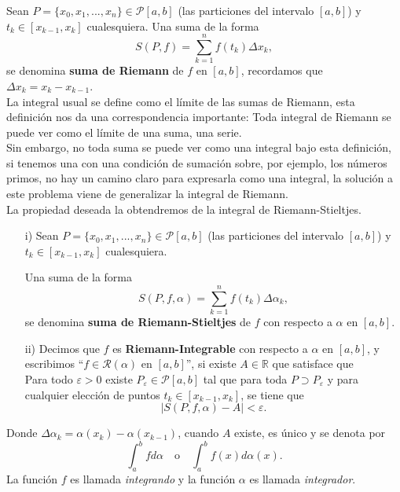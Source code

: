 Sean $P=\{x_0,x_1,...,x_n\}\in\mathcal{P}[a,b]$ (las particiones del intervalo $[a,b]$) y   $t_{k}\in [x_{k-1},x_k]$ cualesquiera. Una suma de la forma $$S(P,f)=\sum_{k=1}^{n}f(t_k)\Delta x_k,$$ se denomina \textbf{suma de Riemann} de $f$ en $[a,b]$, recordamos que $\Delta x_k=x_k-x_{k-1}$.\\

La integral usual se define como el límite de las sumas de Riemann, esta definición nos da una correspondencia importante: Toda integral de Riemann se puede ver como el límite de una suma, una serie.\\

Sin embargo, no toda suma se puede ver como una integral bajo esta definición, si tenemos una con una condición de sumación sobre, por ejemplo, los números primos, no hay un camino claro para expresarla como una integral, la solución a este problema viene de generalizar la integral de Riemann.\\

La propiedad deseada la obtendremos de la integral de Riemann-Stieltjes.

\begin{definition}
\phantom{uwu}
\begin{itemize}

    \item[i)] Sean $P=\{x_0,x_1,...,x_n\}\in\mathcal{P}[a,b]$ (las particiones del intervalo $[a,b]$) y   $t_{k}\in [x_{k-1},x_k]$ cualesquiera. 
    
    Una suma de la forma $$S(P,f,\alpha)=\sum_{k=1}^{n}f(t_k)\Delta \alpha_k,$$ se denomina \textbf{suma de Riemann-Stieltjes} de $f$ con respecto a $\alpha$ en $[a,b]$.
    
    \item[ii)] Decimos que $f$ es \textbf{Riemann-Integrable} con respecto a $\alpha$ en $[a,b]$, y escribimos ``$f\in \mathcal{R}(\alpha)$ en $[a,b]$'', si existe $A\in \mathbb R$ que satisface que\\ 
    Para todo $\varepsilon>0$ existe $P_{\varepsilon}\in \mathcal{P}[a,b]$ tal que para toda $P\supset P_{\varepsilon}$ y para cualquier elección de puntos $t_{k}\in [x_{k-1},x_k]$, se tiene que $$\mid S(P,f,\alpha) - A\mid <\varepsilon.$$
    \end{itemize}
\end{definition}

Donde $\Delta\alpha_k=\alpha(x_k)-\alpha(x_{k-1})$, cuando $A$ existe, es único y se denota por $$\int_a^b fd\alpha \quad \text{o} \quad \int_{a}^{b} f(x)d\alpha(x).$$ 
La función $f$ es llamada \textit{integrando} y la función $\alpha$ es llamada \textit{integrador}.\\


